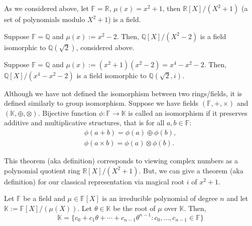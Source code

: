 \documentclass[../lecture-notes.tex]{subfiles}
\begin{document}
\begin{example}
    As we considered above, let $\mathbb{F}=\mathbb{R}$, $\mu(x)=x^2+1$, then $\mathbb{R}[X]/(X^2+1)$ (a set of polynomials modulo $X^2+1$) is a field.
\end{example}
\begin{example}
    Suppose $\mathbb{F}=\mathbb{Q}$ and $\mu(x) := x^2-2$. Then, $\mathbb{Q}[X]/(X^2-2)$ is a field isomorphic to $\mathbb{Q}(\sqrt{2})$, considered above.
\end{example}
\begin{example}
    Suppose $\mathbb{F}=\mathbb{Q}$ and $\mu(x) := (x^2+1)(x^2-2)=x^4-x^2-2$. Then, $\mathbb{Q}[X]/(x^4-x^2-2)$ is a field isomorphic to $\mathbb{Q}(\sqrt{2},i)$.
\end{example}

\begin{remark}
    Although we have not defined the isomorphism between two rings/fields, it is defined similarly to group isomorphism. Suppose we have fields $(\mathbb{F},+,\times)$ and $(\mathbb{K}, \oplus, \otimes)$. Bijective function $\phi: \mathbb{F} \to \mathbb{K}$ is called an isomorphism if it preserves additive and multiplicative structures, that is for all $a,b \in \mathbb{F}$:
    \begin{equation*}
        \begin{aligned}
            \phi(a+b) = \phi(a) \oplus \phi(b),\\
            \phi(a\times b) = \phi(a) \otimes \phi(b).
        \end{aligned}
    \end{equation*}
\end{remark}

This theorem (aka definition) corresponds to viewing complex numbers as a polynomial quotient ring $\mathbb{R}[X]/(X^2+1)$. But, we can give a theorem (aka definition) for our classical representation via magical root $i$ of $x^2+1$.

\begin{theorem}
    Let $\mathbb{F}$ be a field and $\mu \in \mathbb{F}[X]$ is an irreducible polynomial of degree $n$ and let $\mathbb{K} := \mathbb{F}[X]/(\mu(X))$. Let $\theta \in \mathbb{K}$ be the root of $\mu$ over $\mathbb{K}$. Then,
    \begin{equation*}
        \mathbb{K} = \{c_0+c_1\theta+\cdots+c_{n-1}\theta^{n-1}: c_0,\dots,c_{n-1} \in \mathbb{F}\}
    \end{equation*}
\end{theorem}
\end{document}
